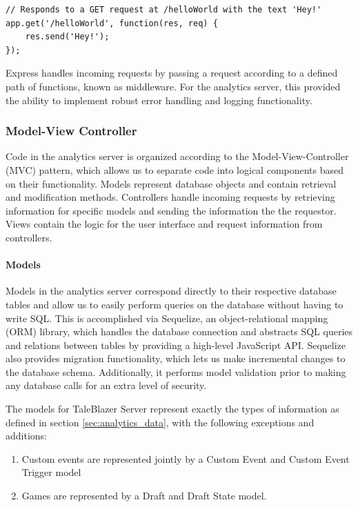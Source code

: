 \medskip
\begin{lstlisting}[caption=Example of Express' URL routing]
// Responds to a GET request at /helloWorld with the text 'Hey!'
app.get('/helloWorld', function(res, req) {
	res.send('Hey!');
});
\end{lstlisting}

Express handles incoming requests by passing a request according to a defined path of functions, known as middleware. For the analytics server, this provided the ability to implement robust error handling and logging functionality. 

\subsubsection{Model-View Controller}

Code in the analytics server is organized according to the Model-View-Controller (MVC) pattern, which allows us to separate code into logical components based on their functionality. Models represent database objects and contain retrieval and modification methods. Controllers handle incoming requests by retrieving information for specific models and sending the information the the requestor. Views contain the logic for the user interface and request information from controllers. 

\paragraph{Models} 
Models in the analytics server correspond directly to their respective database tables and allow us to easily perform queries on the database without having to write SQL. This is accomplished via Sequelize, an object-relational mapping (ORM) library, which handles the database connection and abstracts SQL queries and relations between tables by providing a high-level JavaScript API. Sequelize also provides migration functionality, which lets us make incremental changes to the database schema. Additionally, it performs model validation prior to making any database calls for an extra level of security.

The models for TaleBlazer Server represent exactly the types of information as defined in section \ref{sec:analytics_data}, with the following exceptions and additions:

	\begin{enumerate}
		\item Custom events are represented jointly by a Custom Event and Custom Event Trigger model
		\item Games are represented by a Draft and Draft State model.
	\end{enumerate}

